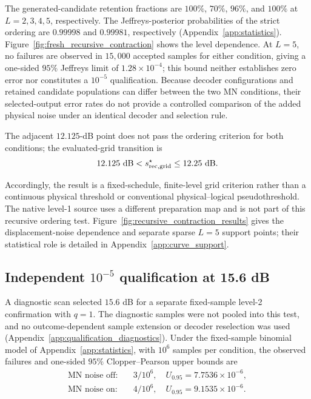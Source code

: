 \documentclass[aps,
prx,
superscriptaddress,
reprint,
longbibliography,
floatfix]{revtex4-2}
\newcounter{criterion}[section]
\begin{document}
The generated-candidate retention fractions are $100\%$, $70\%$, $96\%$, and $100\%$ at $L=2,3,4,5$, respectively. The Jeffreys-posterior probabilities of the strict ordering are $0.99998$ and $0.99981$, respectively (Appendix~\ref{app:statistics}). Figure~\ref{fig:fresh_recursive_contraction} shows the level dependence. At $L=5$, no failures are observed in $15{,}000$ accepted samples for either condition, giving a one-sided $95\%$ Jeffreys limit of $1.28\times10^{-4}$; this bound neither establishes zero error nor constitutes a $10^{-5}$ qualification.
Because decoder configurations and retained candidate populations can differ between the two MN conditions, their selected-output error rates do not provide a controlled comparison of the added physical noise under an identical decoder and selection rule.



The adjacent $12.125$-dB point does not pass the ordering criterion for both conditions; the evaluated-grid transition is
\begin{equation}
12.125~\mathrm{dB}<s_{\rm rec,grid}^{\star}\leq12.25~\mathrm{dB}.
\label{eq:recursive_grid_transition_interval}
\end{equation}

Accordingly, the result is a fixed-schedule, finite-level grid criterion rather than a continuous physical threshold or conventional physical--logical pseudothreshold. The native level-1 source uses a different preparation map and is not part of this recursive ordering test. Figure~\ref{fig:recursive_contraction_results} gives the displacement-noise dependence and separate sparse $L=5$ support points; their statistical role is detailed in Appendix~\ref{app:curve_support}.



\subsection{\texorpdfstring{Independent $10^{-5}$ qualification at 15.6 dB}{Independent 10-to-the-minus-five qualification at 15.6 dB}}\label{sec:direct_target_qualification}
A diagnostic scan selected $15.6$ dB for a separate fixed-sample level-2 confirmation with $q=1$. The diagnostic samples were not pooled into this test, and no outcome-dependent sample extension or decoder reselection was used (Appendix~\ref{app:qualification_diagnostics}). Under the fixed-sample binomial model of Appendix~\ref{app:statistics}, with $10^6$ samples per condition, the observed failures and one-sided $95\%$ Clopper--Pearson upper bounds are
\begin{align}
\text{MN noise off}:&\quad 3/10^6,\quad U_{0.95}=7.7536\times10^{-6},\\
\text{MN noise on}:&\quad 4/10^6,\quad U_{0.95}=9.1535\times10^{-6}.
\end{align}
\end{document}
